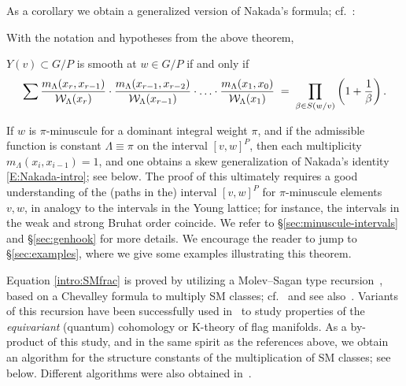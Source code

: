 	As a corollary we obtain a generalized version of Nakada's formula; cf.~:
	\begin{corol}\label{thm:intro-main} With the notation and hypotheses from the above theorem, 
		\begin{center}
			$Y(v)\subset G/P$ is smooth at $w\in G/P$  if and only if
			\begin{equation}\label{E:intro-main}
				\sum\frac{m_\Lambda(x_r,x_{r-1})}{\mathcal{W}_\Lambda(x_r)}\cdot \frac{m_\Lambda(x_{r-1},x_{r-2})}{\mathcal{W}_\Lambda(x_{r-1})}\cdot \ldots \cdot \frac{m_\Lambda(x_{1},x_{0})}{\mathcal{W}_\Lambda(x_{1})}
				\;=\;
				\prod_{\beta \in S(w/v)} \left(1+\frac{1}{\beta}\right) \/.\end{equation}
		\end{center}
\end{corol}
If $w$ is $\pi$-minuscule for a dominant integral weight $\pi$, and if the admissible function
is constant $\Lambda \equiv \pi$ on the interval $[v,w]^P$,
then each multiplicity $m_\Lambda(x_{i},x_{i-1})=1$, and one obtains 
a skew generalization of Nakada's identity \eqref{E:Nakada-intro}; see  below. 
The proof of this ultimately requires a 
good understanding of the (paths in the) interval $[v,w]^P$ for $\pi$-minuscule elements $v,w$, in analogy to 
the intervals in the Young lattice; for instance, the intervals in the weak and strong Bruhat order
coincide. We refer to \S\ref{sec:minuscule-intervals} and \S\ref{sec:genhook} 
for more details. We encourage the reader to jump to \S\ref{sec:examples}, where we give some 
	examples illustrating this theorem.

Equation \eqref{intro:SMfrac} is proved by utilizing a Molev--Sagan type recursion~\cite{molev.sagan:Littlewood-Richardson}, based on a Chevalley formula to multiply SM classes; 
cf.~ and see also~\cite{su:quantum,AMSS:shadows}. Variants of this recursion have been successfully used in~\cite{knutson.tao:puzzles,
	mihalcea:eqqgr,mihalcea:eqqhom,naruse2014schubert,BCMP:QKChev,naruse2019skew}
to study properties of the {\em equivariant} (quantum) cohomology or K-theory of flag manifolds. As a by-product of this study, and in the same spirit as the references
above, we obtain an algorithm for the structure constants of the multiplication of SM classes; see  below. Different algorithms were also obtained in~\cite{su:structure}.

